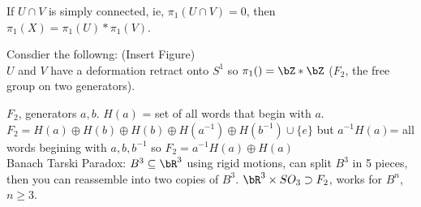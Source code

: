 \begin{corollary}
    If $U \cap V$ is simply connected, ie, $\pi_1(U \cap V)=0$, then $\pi_1(X) = \pi_1(U)*\pi_1(V)$. 
\end{corollary}

\begin{example}
    Consdier the followng: (Insert Figure) \\
    $U$ and $V$ have a deformation retract onto $S^1$ so $\pi_1() = \bZ * \bZ$ ($F_2$, the free group on two generators).  
\end{example} 

\noindent
$F_2$, generators $a,b$. $H(a)$ = set of all words that begin with $a$. $F_2 = H(a) \oplus H(b) \oplus H(b) \oplus H(a^{-1}) \oplus H(b^{-1}) \cup \{e\}$ but $a^{-1}H(a)$= all words begining with $a,b,b^{-1}$ so $F_2 = a^{-1}H(a) \oplus H(a)$ \\
Banach Tarski Paradox: $B^3 \subseteq \bR^3$ using rigid motions, can split $B^3$ in 5 pieces, then you can reassemble into two copies of $B^3$. $\bR^3 \times SO_3 \supset F_2$, works for $B^n$, $n \ge 3$. 